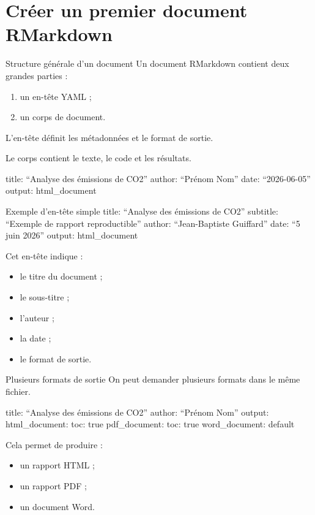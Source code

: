 \documentclass[
  10pt,
  ignorenonframetext,
]{beamer}
\providecommand{\tightlist}{%
  \setlength{\itemsep}{0pt}\setlength{\parskip}{0pt}}
\begin{document}
\section{Créer un premier document
RMarkdown}\label{cruxe9er-un-premier-document-rmarkdown}

\begin{frame}{Structure générale d'un document}
\label{structure-guxe9nuxe9rale-dun-document}
Un document RMarkdown contient deux grandes parties :

\begin{enumerate}
\tightlist
\item
  un en-tête YAML ;
\item
  un corps de document.
\end{enumerate}

L'en-tête définit les métadonnées et le format de sortie.

Le corps contient le texte, le code et les résultats.

title: ``Analyse des émissions de CO2'' author: ``Prénom Nom'' date:
``2026-06-05'' output: html\_document
\end{frame}

\begin{frame}{Exemple d'en-tête simple}
\label{exemple-den-tuxeate-simple}
title: ``Analyse des émissions de CO2'' subtitle: ``Exemple de rapport
reproductible'' author: ``Jean-Baptiste Guiffard'' date: ``5 juin 2026''
output: html\_document

Cet en-tête indique :

\begin{itemize}
\tightlist
\item
  le titre du document ;
\item
  le sous-titre ;
\item
  l'auteur ;
\item
  la date ;
\item
  le format de sortie.
\end{itemize}
\end{frame}

\begin{frame}{Plusieurs formats de sortie}
\label{plusieurs-formats-de-sortie}
On peut demander plusieurs formats dans le même fichier.

title: ``Analyse des émissions de CO2'' author: ``Prénom Nom'' output:
html\_document: toc: true pdf\_document: toc: true word\_document:
default

Cela permet de produire :

\begin{itemize}
\tightlist
\item
  un rapport HTML ;
\item
  un rapport PDF ;
\item
  un document Word.
\end{itemize}
\end{frame}
\end{document}
